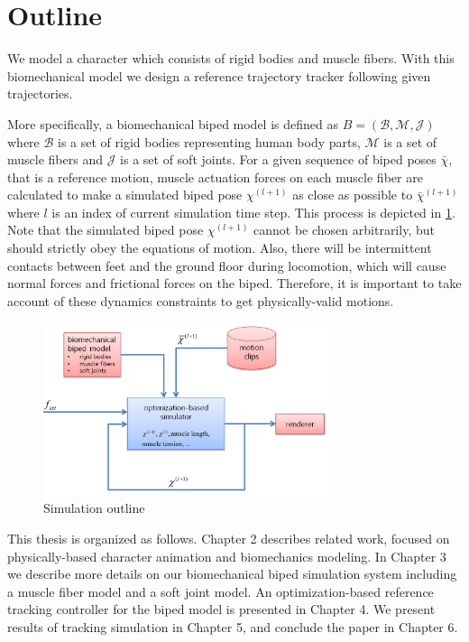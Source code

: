 \documentclass[master,english,final]{kaist-ucs}
\begin{document}
\section{Outline}

We model a character which consists of rigid bodies and muscle fibers.
With this biomechanical model we design a reference trajectory tracker
following given trajectories.

More specifically, a biomechanical biped model is defined as $B = (\mathcal{B}, \mathcal{M}, \mathcal {J})$ where
$\mathcal{B}$ is a set of rigid bodies representing human body parts,
$\mathcal{M}$ is a set of muscle fibers and $\mathcal{J}$ is a set of
soft joints. For a given sequence of biped poses $\bar{\chi}$,
that is a reference motion, muscle actuation forces on
each muscle fiber are calculated to make a simulated biped pose
$\chi^{(l+1)}$ as close as possible to
$\bar{\chi}^{(l+1)}$ where $l$ is an index of current simulation time step.
This process is depicted in \ref{overview2}.
Note that the simulated biped pose $\chi^{(l+1)}$ cannot be chosen arbitrarily,
but should strictly obey the equations of motion. Also, there will be intermittent contacts
between feet and the ground floor during locomotion, which will cause normal forces and frictional forces on
the biped. Therefore, it is important to take account of these dynamics constraints to get physically-valid
motions.


\begin{figure}[h!]
\label{probdef}
  \centering
  \includegraphics[width=0.75\textwidth]{overview2}
  \caption{Simulation outline}
  \label{overview2}
\end{figure}

This thesis is organized as follows. Chapter 2 describes related work,
focused on physically-based character animation and biomechanics modeling.
In Chapter 3 we describe more details on our biomechanical biped simulation system
including a muscle fiber model and a soft joint model.
An optimization-based reference tracking controller for the biped model
is presented in Chapter 4. We present results of tracking simulation in Chapter 5,
and conclude the paper in Chapter 6.
\end{document}
